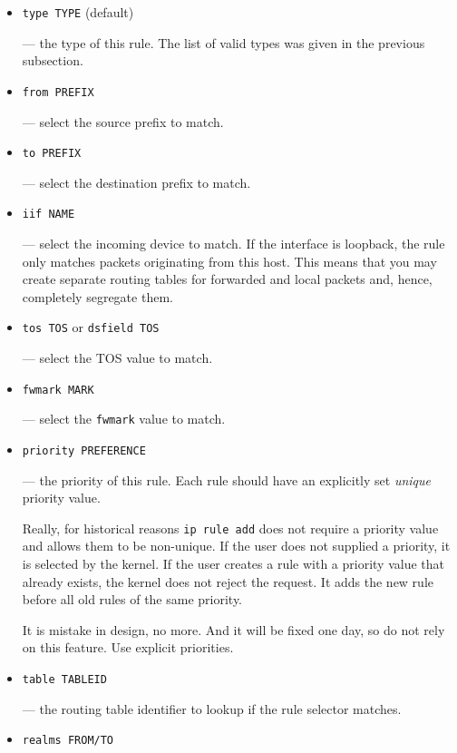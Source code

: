 \begin{itemize}
\item \verb|type TYPE| (default)

--- the type of this rule. The list of valid types was given in the previous
subsection.

\item \verb|from PREFIX|

--- select the source prefix to match.

\item \verb|to PREFIX|

--- select the destination prefix to match.

\item \verb|iif NAME|

--- select the incoming device to match. If the interface is loopback,
the rule only matches packets originating from this host. This means that you
may create separate routing tables for forwarded and local packets and,
hence, completely segregate them.

\item \verb|tos TOS| or \verb|dsfield TOS|

--- select the TOS value to match.

\item \verb|fwmark MARK|

--- select the \verb|fwmark| value to match.

\item \verb|priority PREFERENCE|

--- the priority of this rule. Each rule should have an explicitly
set {\em unique\/} priority value.
\begin{NB}
  Really, for historical reasons \verb|ip rule add| does not require a
  priority value and allows them to be non-unique.
  If the user does not supplied a priority, it is selected by the kernel.
  If the user creates a rule with a priority value that
  already exists, the kernel does not reject the request. It adds
  the new rule before all old rules of the same priority.

  It is mistake in design, no more. And it will be fixed one day,
  so do not rely on this feature. Use explicit priorities.
\end{NB}


\item \verb|table TABLEID|

--- the routing table identifier to lookup if the rule selector matches.

\item \verb|realms FROM/TO|


\end{itemize}
